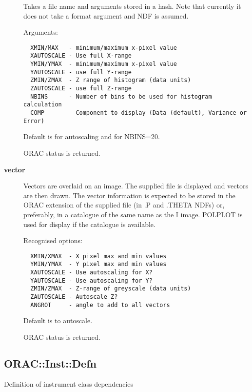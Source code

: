 \begin{description}
Takes a file name and arguments stored in a hash.
Note that currently it does not take a format argument
and NDF is assumed.



Arguments:

\begin{verbatim}
  XMIN/MAX   - minimum/maximum x-pixel value
  XAUTOSCALE - Use full X-range
  YMIN/YMAX  - minimum/maximum x-pixel value
  YAUTOSCALE - use full Y-range
  ZMIN/ZMAX  - Z range of histogram (data units)
  ZAUTOSCALE - use full Z-range
  NBINS      - Number of bins to be used for histogram calculation
  COMP       - Component to display (Data (default), Variance or Error)
\end{verbatim}


Default is for autoscaling and for NBINS=20.



ORAC status is returned.

\item[\textbf{vector}] \mbox{}

Vectors are overlaid on an image. The supplied file is displayed
and vectors are then drawn. The vector information is expected
to be stored in the ORAC extension of the supplied file
(in .P and .THETA NDFs) or, preferably, in a catalogue of the
same name as the I image. POLPLOT is used for display if
the catalogue is available.



Recognised options:

\begin{verbatim}
  XMIN/XMAX  - X pixel max and min values
  YMIN/YMAX  - Y pixel max and min values
  XAUTOSCALE - Use autoscaling for X?
  YAUTOSCALE - Use autoscaling for Y?
  ZMIN/ZMAX  - Z-range of greyscale (data units)
  ZAUTOSCALE - Autoscale Z?
  ANGROT     - angle to add to all vectors
\end{verbatim}


Default is to autoscale.



ORAC status is returned.

\end{description}


\subsection{ORAC::Inst::Defn\label{ORAC::Inst::Defn}}

Definition of instrument class dependencies

